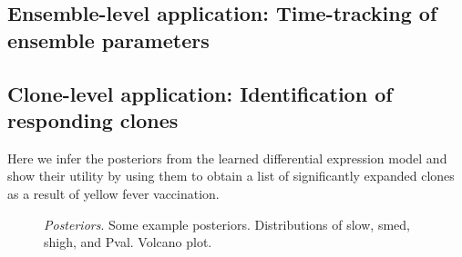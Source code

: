 \documentclass[letterpaper,english,prl,reprint,longbibliography]{revtex4-1} %
\begin{document}
% 

\subsection*{Ensemble-level application: Time-tracking of ensemble parameters}

\subsection*{Clone-level application: Identification of responding clones}

Here we infer the posteriors from the learned differential expression model and show their utility by using them to obtain a list of significantly expanded clones as a result of yellow fever vaccination. 
\begin{figure}[ht!]
\caption{
\emph{Posteriors}. Some example posteriors. Distributions of slow, smed, shigh, and Pval. Volcano plot.
\label{fig:posteriors}}
\end{figure}
\end{document}
